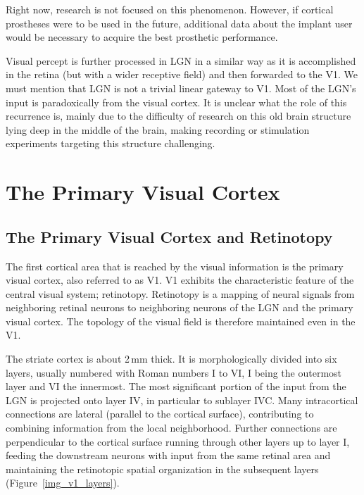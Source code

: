 Right now, research is not focused on this phenomenon. However, if cortical prostheses were to be used in the future, additional data about the implant user would be necessary to acquire the best prosthetic performance.

Visual percept is further processed in LGN in a similar way as it is accomplished in the retina (but with a wider receptive field) and then forwarded to the V1. We must mention that LGN is not a trivial linear gateway to V1. Most of the LGN’s input is paradoxically from the visual cortex. It is unclear what the role of this recurrence is, mainly due to the difficulty of research on this old brain structure lying deep in the middle of the brain, making recording or stimulation experiments targeting this structure challenging. 


\section{The Primary Visual Cortex}

\subsection{The Primary Visual Cortex and Retinotopy}

The first cortical area that is reached by the visual information is the primary visual cortex, also referred to as V1. V1 exhibits the characteristic feature of the central visual system; retinotopy. Retinotopy is a mapping of neural signals from neighboring retinal neurons to neighboring neurons of the LGN and the primary visual cortex. The topology of the visual field is therefore maintained even in the V1.

The striate cortex is about 2\,mm thick. It is morphologically divided into six layers, usually numbered with Roman numbers I to VI, I being the outermost layer and VI the innermost. The most significant portion of the input from the LGN is projected onto layer IV, in particular to sublayer IVC. Many intracortical connections are lateral (parallel to the cortical surface), contributing to combining information from the local neighborhood. Further connections are perpendicular to the cortical surface running through other layers up to layer I, feeding the downstream neurons with input from the same retinal area and maintaining the retinotopic spatial organization in the subsequent layers (Figure~\ref{img_v1_layers}).


